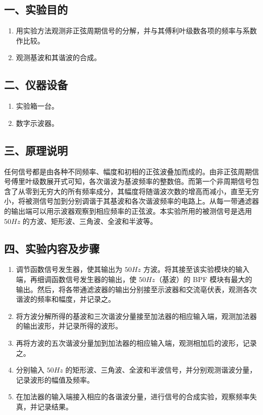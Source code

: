 \documentclass[dvipsnames, svgnames,a4paper,11pt]{article}
\begin{document}
\subsection*{一、实验目的}
\begin{enumerate}
  \item 用实验方法观测非正弦周期信号的分解，并与其傅利叶级数各项的频率与系数作比较。 
  \item 观测基波和其谐波的合成。
\end{enumerate}

\subsection*{二、仪器设备}
\begin{enumerate}
  \item 实验箱一台。
  \item 数字示波器。
\end{enumerate}

\subsection*{三、原理说明}
任何信号都是由各种不同频率、幅度和初相的正弦波叠加而成的。由非正弦周期信号傅里叶级数展开式可知，各次谐波为基波频率的整数倍。而第一个非周期信号包含了从零到无穷大的所有频率成分，其幅度将随谐波次数的增高而减小，直至无穷小，将被测信号加到分别调谐于其基波和各次谐波频率的电路上。从每一带通滤器的输出端可以用示波器观察到相应频率的正弦波。本实验所用的被测信号是选用 $50Hz$ 的方波、矩形波、三角波、全波和半波等。

\subsection*{四、实验内容及步骤}
\begin{enumerate}
  \item 调节函数信号发生器，使其输出为 $50Hz$ 方波。将其接至该实验模块的输入端，再细调函数信号发生器的输出，使 $50Hz$（基波）的 BPF 模块有最大的输出。然后，将各带通滤波器的输出分别接至示波器和交流亳伏表，观测各次谐波的频率和幅度，并记录之。
  \item 将方波分解所得的基波和三次谐波分量接至加法器的相应输入端，观测加法器的输出波形，并记录所得的波形。
  \item 再将方波的五次谐波分量加到加法器的相应输入端，观测相加后的波形，记录之。
  \item 分别输入 $50Hz$ 的矩形波、三角波、全波和半波信号，并分别观测谐波分量，记录波形的幅值及频率。
  \item 在加法器的输入端接入相应的各谐波分量，进行信号的合成实验，观察频率失真，并记录结果。
\end{enumerate}
\end{document}
